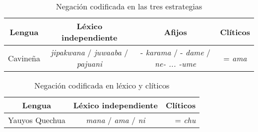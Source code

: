 \begin{table}[htbp]
\centering
\begin{tabular}{lccc}
\multicolumn{1}{c}{\textbf{Lengua}} & \textbf{Léxico independiente} & \textbf{Afijos} & \textbf{Clíticos} \\
\hline
Cavineña & {\setmainfont{Charis SIL} \textit{jipakwana}} / {\setmainfont{Charis SIL} \textit{juwaaba}} / {\setmainfont{Charis SIL} \textit{pajuani}} & -{\setmainfont{Charis SIL} \textit{karama}} / -{\setmainfont{Charis SIL} \textit{dame}} / {\setmainfont{Charis SIL} \textit{ne- ... -ume}} & ={\setmainfont{Charis SIL} \textit{ama}} \\
\hline
\end{tabular}
\caption{Negación codificada en las tres estrategias}
\label{cuadro11}
\end{table}

\begin{table}[htbp]
\centering
\begin{tabular}{lcr}
\multicolumn{1}{c}{\textbf{Lengua}} & \textbf{Léxico independiente} & \textbf{Clíticos} \\
\hline
Yauyos Quechua & {\setmainfont{Charis SIL} \textit{mana}} / {\setmainfont{Charis SIL} \textit{ama}} / {\setmainfont{Charis SIL} \textit{ni}} & ={\setmainfont{Charis SIL} \textit{chu}} \\
\hline
\end{tabular}
\caption{Negación codificada en léxico y clíticos}
\label{cuadro12}
\end{table}
  
  
  